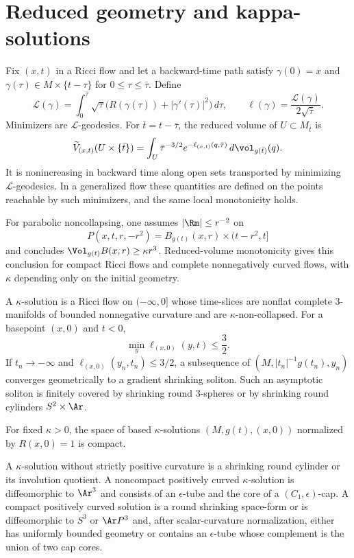 \section{Reduced geometry and kappa-solutions}

Fix $(x,t)$ in a Ricci flow and let a backward-time path satisfy
$\gamma(0)=x$ and $\gamma(\tau)\in M\times\{t-\tau\}$ for
$0\leq\tau\leq\bar\tau$. Define
\[
  {\mathcal L}(\gamma)=
  \int_0^{\bar\tau}\sqrt\tau
  \bigl(R(\gamma(\tau))+|\gamma'(\tau)|^2\bigr)\,d\tau,
  \qquad
  \ell(\gamma)=\frac{{\mathcal L}(\gamma)}{2\sqrt{\bar\tau}}.
\]
Minimizers are ${\mathcal L}$-geodesics. For $\bar t=t-\bar\tau$, the reduced
volume of $U\subset M_{\bar t}$ is
\[
  \widetilde V_{(x,t)}(U\times\{\bar t\})
  =\int_U \bar\tau^{-3/2}e^{-\ell_{(x,t)}(q,\bar\tau)}
  \,d\vol_{g(\bar t)}(q).
\]
It is nonincreasing in backward time along open sets transported by minimizing
${\mathcal L}$-geodesics. In a generalized flow these quantities are defined
on the points reachable by such minimizers, and the same local monotonicity
holds.

For parabolic noncollapsing, one assumes
$|\Rm|\leq r^{-2}$ on
\[
  P(x,t,r,-r^2)=B_{g(t)}(x,r)\times(t-r^2,t]
\]
and concludes $\Vol_{g(t)}B(x,r)\geq\kappa r^3$. Reduced-volume monotonicity
gives this conclusion for compact Ricci flows and complete nonnegatively
curved flows, with $\kappa$ depending only on the initial geometry.

A $\kappa$-solution is a Ricci flow on $(-\infty,0]$ whose time-slices are
nonflat complete $3$-manifolds of bounded nonnegative curvature and are
$\kappa$-non-collapsed. For a basepoint $(x,0)$ and $t<0$,
\[
  \min_y\ell_{(x,0)}(y,t)\leq\frac32.
\]
If $t_n\to-\infty$ and
$\ell_{(x,0)}(y_n,t_n)\leq3/2$, a subsequence of
$(M,|t_n|^{-1}g(t_n),y_n)$ converges geometrically to a gradient shrinking
soliton. Such an asymptotic soliton is finitely covered by shrinking round
$3$-spheres or by shrinking round cylinders $S^2\times\Ar$.

\begin{theorem}
\label{thm:compactness-kappa-solutions}
For fixed $\kappa>0$, the space of based $\kappa$-solutions
$(M,g(t),(x,0))$ normalized by $R(x,0)=1$ is compact.
\end{theorem}

A $\kappa$-solution without strictly positive curvature is a shrinking round
cylinder or its involution quotient. A noncompact positively curved
$\kappa$-solution is diffeomorphic to $\Ar^3$ and consists of an
$\epsilon$-tube and the core of a $(C_1,\epsilon)$-cap. A compact positively
curved solution is a round shrinking space-form or is diffeomorphic to
$S^3$ or $\Ar P^3$ and, after scalar-curvature normalization, either has
uniformly bounded geometry or contains an $\epsilon$-tube whose complement is
the union of two cap cores.

